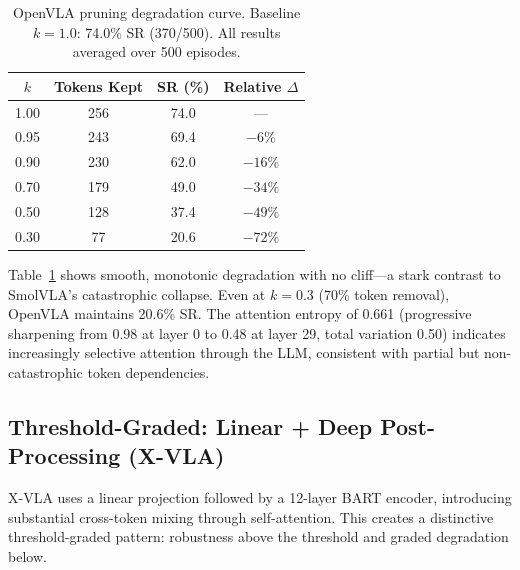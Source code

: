 \documentclass[letterpaper]{article}
\begin{document}
\begin{table}[h]
\centering
\caption{OpenVLA pruning degradation curve. Baseline $k{=}1.0$: 74.0\% SR (370/500). All results averaged over 500 episodes.}
\label{tab:openvla_curve}
\small
\begin{tabular}{cccc}
\toprule
$k$ & \textbf{Tokens Kept} & \textbf{SR (\%)} & \textbf{Relative $\Delta$} \\
\midrule
1.00 & 256 & 74.0 & --- \\
0.95 & 243 & 69.4 & $-6\%$ \\
0.90 & 230 & 62.0 & $-16\%$ \\
0.70 & 179 & 49.0 & $-34\%$ \\
0.50 & 128 & 37.4 & $-49\%$ \\
0.30 & 77 & 20.6 & $-72\%$ \\
\bottomrule
\end{tabular}
\end{table}

Table~\ref{tab:openvla_curve} shows smooth, monotonic degradation with no cliff---a stark contrast to SmolVLA's catastrophic collapse. Even at $k=0.3$ (70\% token removal), OpenVLA maintains 20.6\% SR. The attention entropy of 0.661 (progressive sharpening from 0.98 at layer 0 to 0.48 at layer 29, total variation 0.50) indicates increasingly selective attention through the LLM, consistent with partial but non-catastrophic token dependencies.

\subsection{Threshold-Graded: Linear + Deep Post-Processing (X-VLA)}

X-VLA uses a linear projection followed by a 12-layer BART encoder, introducing substantial cross-token mixing through self-attention. This creates a distinctive threshold-graded pattern: robustness above the threshold and graded degradation below.
\end{document}
